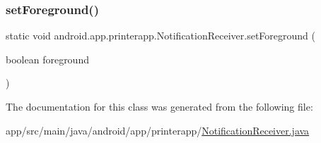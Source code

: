 \subsubsection{\texorpdfstring{set\+Foreground()}{setForeground()}}
{\footnotesize\ttfamily static void android.\+app.\+printerapp.\+Notification\+Receiver.\+set\+Foreground (\begin{DoxyParamCaption}\item[{boolean}]{foreground }\end{DoxyParamCaption})\hspace{0.3cm}{\ttfamily [static]}}



The documentation for this class was generated from the following file\+:\begin{DoxyCompactItemize}
\item 
app/src/main/java/android/app/printerapp/\hyperlink{_notification_receiver_8java}{Notification\+Receiver.\+java}\end{DoxyCompactItemize}
